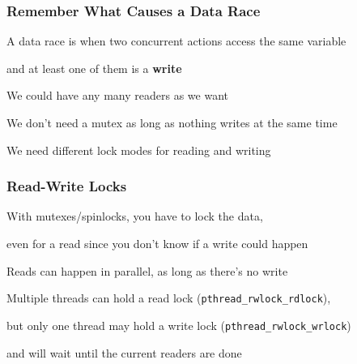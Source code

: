   \begin{frame}
    \frametitle{Remember What Causes a Data Race}

    A data race is when two concurrent actions access the same variable

    and at least one of them is a \textbf{write}

    \vspace{2em}

    We could have any many readers as we want

    \hspace{2em} We don't need a mutex as long as nothing writes at the same
    time

    \vspace{2em}

    We need different lock modes for reading and writing
  \end{frame}

  \begin{frame}
    \frametitle{Read-Write Locks}

    With mutexes/spinlocks, you have to lock the data,

    even for a read since you don't know if a write could happen

    \vspace{2em}

    Reads can happen in parallel, as long as there's no write

    \vspace{2em}

    Multiple threads can hold a read lock ({\tt pthread\_rwlock\_rdlock}),

    but only one thread may hold a write lock ({\tt pthread\_rwlock\_wrlock})

    and will wait until the current readers are done
  \end{frame}

